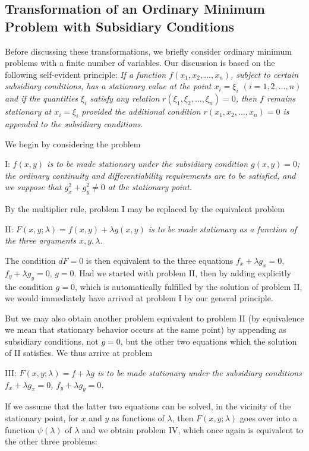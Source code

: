 \subsection{Transformation of an Ordinary Minimum Problem with Subsidiary Conditions}
Before discussing these transformations, we briefly consider ordinary minimum problems with a finite number of variables. Our discussion is based on the following self-evident principle: \emph{If a function $f(x_1,x_2,\ldots,x_n)$, subject to certain subsidiary conditions, has a stationary value at the point $x_i=\xi_i$ $(i=1,2,\ldots,n)$ and if the quantities $\xi_i$ satisfy any relation $r(\xi_1,\xi_2,\ldots,\xi_n)=0$, then $f$ remains stationary at $x_i=\xi_i$ provided the additional condition $r(x_1,x_2,\ldots,x_n)=0$ is appended to the subsidiary conditions.}

We begin by considering the problem

I: \emph{$f(x,y)$ is to be made stationary under the subsidiary condition $g(x,y)=0$; the ordinary continuity and differentiability requirements are to be satisfied, and we suppose that $g_x^2+g_y^2\ne0$ at the stationary point.}

By the multiplier rule, problem I may be replaced by the equivalent problem

II: \emph{$F(x,y;\lambda)=f(x,y)+\lambda g(x,y)$ is to be made stationary as a function of the three arguments $x,y,\lambda$.}

The condition $dF=0$ is then equivalent to the three equations $f_x+\lambda g_x=0$, $f_y+\lambda g_y=0$, $g=0$. Had we started with problem II, then by adding explicitly the condition $g=0$, which is automatically fulfilled by the solution of problem II, we would immediately have arrived at problem I by our general principle.

But we may also obtain another problem equivalent to problem II (by equivalence we mean that stationary behavior occurs at the same point) by appending as subsidiary conditions, not $g=0$, but the other two equations which the solution of II satisfies. We thus arrive at problem

III: \emph{$F(x,y;\lambda)=f+\lambda g$ is to be made stationary under the subsidiary conditions $f_x+\lambda g_x=0$, $f_y+\lambda g_y=0$.}

If we assume that the latter two equations can be solved, in the vicinity of the stationary point, for $x$ and $y$ as functions of $\lambda$, then $F(x,y;\lambda)$ goes over into a function $\psi(\lambda)$ of $\lambda$ and we obtain problem IV, which once again is equivalent to the other three problems:

